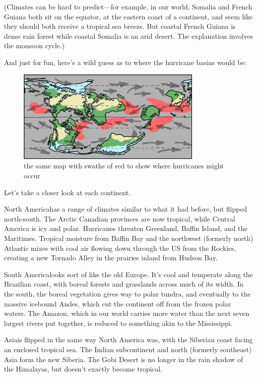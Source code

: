 {(Climates can be hard to predict—for example, in our world, Somalia and French Guiana both sit on the equator, at the eastern coast of a continent, and seem like they should both receive a tropical sea breeze. But coastal French Guiana is dense rain forest while coastal Somalia is an arid desert. The explanation involves the monsoon cycle.)}

{And just for fun, here’s a wild guess as to where the hurricane basins would be:}

\begin{figure}[!htbp]
\centering
\includegraphics[scale=0.5, max width=0.8\textwidth]{imgs/a/10/cassini_hurricanes.png}
\caption{the same map with swaths of red to show where hurricanes might occur}
\end{figure}

{Let’s take a closer look at each continent.}

{North Americahas a range of climates similar to what it had before, but flipped north-south. The Arctic Canadian provinces are now tropical, while Central America is icy and polar. Hurricanes threaten Greenland, Baffin Island, and the Maritimes. Tropical moisture from Baffin Bay and the northwest (formerly north) Atlantic mixes with cool air flowing down through the US from the Rockies, creating a new Tornado Alley in the prairies inland from Hudson Bay.}

{South Americalooks sort of like the old Europe. It's cool and temperate along the Brazilian coast, with boreal forests and grasslands across much of its width. In the south, the boreal vegetation gives way to polar tundra, and eventually to the massive icebound Andes, which cut the continent off from the frozen polar waters. The Amazon, which in our world carries more water than the next seven largest rivers put together, is reduced to something akin to the Mississippi.}

{Asiais flipped in the same way North America was, with the Siberian coast facing an enclosed tropical sea. The Indian subcontinent and north (formerly southeast) Asia form the new Siberia. The Gobi Desert is no longer in the rain shadow of the Himalayas, but doesn't exactly become tropical.}

